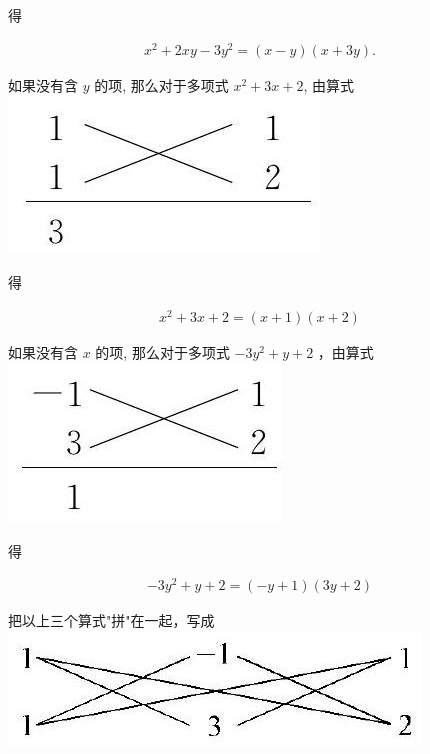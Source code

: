 \documentclass[10pt]{article}
\begin{document}
得

\begin{align*}
x^{2}+2 x y-3 y^{2}=(x-y)(x+3 y) .
\end{align*}

如果没有含 $y$ 的项, 那么对于多项式 $x^{2}+3 x+2$, 由算式\\
\includegraphics[max width=\textwidth, center]{2024_10_30_bd799899fef40368a068g-041(2)}

得

\begin{align*}
x^{2}+3 x+2=(x+1)(x+2)
\end{align*}

如果没有含 $x$ 的项, 那么对于多项式 $-3 y^{2}+y+2$ ，由算式\\
\includegraphics[max width=\textwidth, center]{2024_10_30_bd799899fef40368a068g-041}

得

\begin{align*}
-3 y^{2}+y+2=(-y+1)(3 y+2)
\end{align*}

把以上三个算式"拼"在一起，写成\\
\includegraphics[max width=\textwidth, center]{2024_10_30_bd799899fef40368a068g-042}
\end{document}
